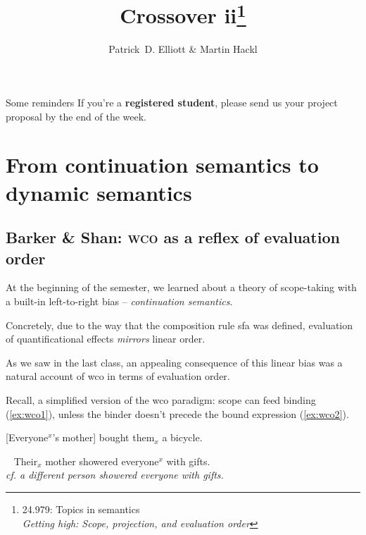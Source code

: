 \documentclass[nols,twoside,nofonts,nobib,nohyper]{tufte-handout}
\title{Crossover ii\thanks{24.979: Topics in
    semantics\\\noindent\textit{Getting high: Scope, projection, and evaluation order}}}
\author[Patrick D. Elliott and Martin Hackl]{Patrick~D. Elliott \& Martin Hackl}
\begin{document}
\maketitle%

\begin{tcolorbox}
  Some reminders
  \tcblower
  If you're a \textbf{registered student}, please send us your project proposal
  by the end of the week.
\end{tcolorbox}

\section{From continuation semantics to dynamic semantics}

\subsection{Barker \& Shan: \textsc{wco} as a reflex of evaluation order}

At the beginning of the semester, we learned about a theory of scope-taking with
a built-in left-to-right bias -- \textit{continuation semantics}.

Concretely, due to the way that the composition rule \ac{sfa} was defined,
evaluation of quantificational effects \textit{mirrors} linear
order.

As we saw in the last class, an appealing consequence of this linear bias was a
natural account of \acf{wco} in terms of evaluation order.

Recall, a simplified version of the \ac{wco} paradigm: scope can feed binding
(\ref{ex:wco1}), unless the binder doesn't precede the bound expression (\ref{ex:wco2}).

\ex
{}[Everyone$^{x}$'s mother] bought them$_{x}$ a bicycle.\label{ex:wco1}
\xe

\ex~
Their$_{x}$ mother showered everyone$^{x}$ with gifts.\\
\textit{cf. a different person showered everyone with gifts.}\label{ex:wco2}
\xe
\end{document}
